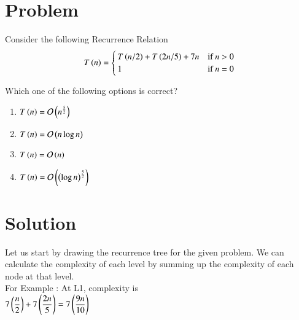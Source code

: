 \documentclass[journal,12pt,twocolumn]{IEEEtran}
\begin{document}
\section{Problem}
Consider the following Recurrence Relation
\begin{multline}
  T\left(n\right) =
  \begin{cases}
  T\left(n/2\right) + T\left(2n/5\right) + 7n & \text{if } n>0 \\
  1 & \text{if } n=0
  \end{cases}
\end{multline}

Which one of the following options is correct?
\begin{enumerate}
    \item $T\left(n\right) = \mathcal{O}\left(n^{\frac{5}{2}}\right)$
    \item $T\left(n\right) = \mathcal{O}\left(n\log n\right)$
    \item $T\left(n\right) = \mathcal{O}\left(n\right)$
    \item $T\left(n\right) = \mathcal{O}\left(\left(\log n\right)^{\frac{5}{2}}\right)$
\end{enumerate}
\section{Solution}
Let us start by drawing the recurrence tree for the given problem. We can calculate the complexity of each level by summing up the complexity of each node at that level.\\ For Example : At L1, complexity is \\
$7\left(\dfrac{n}{2}\right) + 7\left(\dfrac{2n}{5}\right) = 7\left(\dfrac{9n}{10}\right)$
\\
\end{document}
